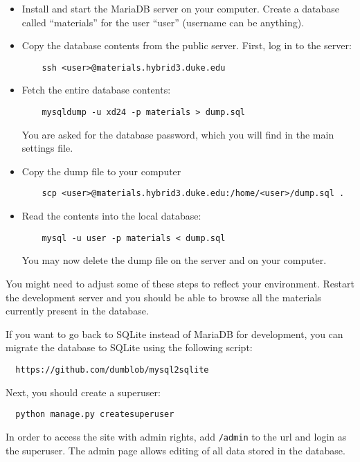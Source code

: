 \documentclass{article}
\begin{document}
\begin{itemize}
\item Install and start the MariaDB server on your computer. Create a database called ``materials'' for the user ``user'' (username can be anything).
\item Copy the database contents from the public server. First, log in to the server:
  \begin{lstlisting}
    ssh <user>@materials.hybrid3.duke.edu
  \end{lstlisting}
\item Fetch the entire database contents:
  \begin{lstlisting}
    mysqldump -u xd24 -p materials > dump.sql
  \end{lstlisting}
  You are asked for the database password, which you will find in the main settings file.
\item Copy the dump file to your computer
  \begin{lstlisting}
    scp <user>@materials.hybrid3.duke.edu:/home/<user>/dump.sql .
  \end{lstlisting}
\item Read the contents into the local database:
  \begin{lstlisting}
    mysql -u user -p materials < dump.sql
  \end{lstlisting}
  You may now delete the dump file on the server and on your computer.
\end{itemize}
You might need to adjust some of these steps to reflect your environment. Restart the development server and you should be able to browse all the materials currently present in the database.

If you want to go back to SQLite instead of MariaDB for development, you can migrate the database to SQLite using the following script:
\begin{verbatim}
  https://github.com/dumblob/mysql2sqlite
\end{verbatim}

Next, you should create a superuser:
\begin{lstlisting}
  python manage.py createsuperuser
\end{lstlisting}
In order to access the site with admin rights, add \verb+/admin+ to the url and login as the superuser. The admin page allows editing of all data stored in the database.
\end{document}
